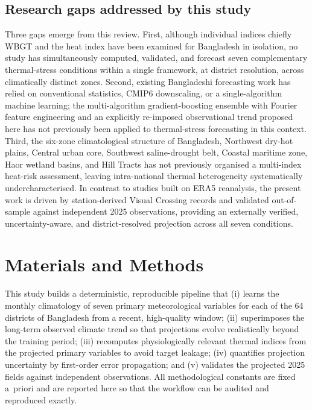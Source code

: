 \documentclass[review,11pt]{elsarticle}
\begin{document}
\subsection{Research gaps addressed by this study}
Three gaps emerge from this review. First, although individual indices chiefly
WBGT and the heat index have been examined for Bangladesh in isolation, no study
has simultaneously computed, validated, and forecast seven complementary
thermal-stress conditions within a single framework, at district resolution, across
climatically distinct zones. Second, existing Bangladeshi forecasting work has
relied on conventional statistics, CMIP6 downscaling, or a single-algorithm machine
learning; the multi-algorithm gradient-boosting ensemble with Fourier feature
engineering and an explicitly re-imposed observational trend proposed here has not
previously been applied to thermal-stress forecasting in this context. Third, the
six-zone climatological structure of Bangladesh, Northwest dry-hot plains, Central
urban core, Southwest saline-drought belt, Coastal maritime zone, Haor wetland
basins, and Hill Tracts has not previously organised a multi-index heat-risk
assessment, leaving intra-national thermal heterogeneity systematically
undercharacterised. In contrast to studies built on ERA5 reanalysis, the present
work is driven by station-derived Visual Crossing records and validated
out-of-sample against independent 2025 observations, providing an externally
verified, uncertainty-aware, and district-resolved projection across all seven
conditions.

\section{Materials and Methods}\label{sec:methods}

This study builds a deterministic, reproducible pipeline that (i) learns the
monthly climatology of seven primary meteorological variables for each of the
64 districts of Bangladesh from a recent, high-quality window; (ii) superimposes
the long-term observed climate trend so that projections evolve realistically
beyond the training period; (iii) recomputes physiologically relevant thermal
indices from the projected primary variables to avoid target leakage; (iv)
quantifies projection uncertainty by first-order error propagation; and (v)
validates the projected 2025 fields against independent observations. All
methodological constants are fixed a~priori and are reported here so that the
workflow can be audited and reproduced exactly.
\end{document}

